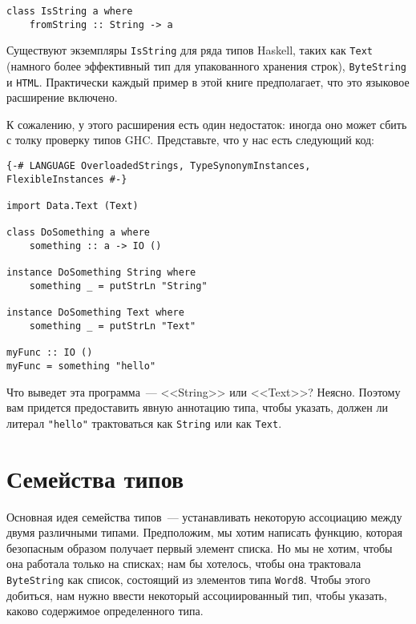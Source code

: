 \begin{lstlisting}
class IsString a where
    fromString :: String -> a
\end{lstlisting}

Существуют экземпляры \lstinline'IsString' для ряда типов Haskell, таких как \lstinline'Text' (намного более эффективный тип для упакованного хранения строк), \lstinline'ByteString' и \lstinline'HTML'. Практически каждый пример в этой книге предполагает, что это языковое расширение включено.

К сожалению, у этого расширения есть один недостаток: иногда оно может сбить с толку проверку типов GHC. Представьте, что у нас есть следующий код:

\begin{lstlisting}
{-# LANGUAGE OverloadedStrings, TypeSynonymInstances, FlexibleInstances #-}

import Data.Text (Text)

class DoSomething a where
    something :: a -> IO ()

instance DoSomething String where
    something _ = putStrLn "String"

instance DoSomething Text where
    something _ = putStrLn "Text"

myFunc :: IO ()
myFunc = something "hello"
\end{lstlisting}

Что выведет эта программа~--- <<String>> или <<Text>>? Неясно. Поэтому вам придется предоставить явную аннотацию типа, чтобы указать, должен ли литерал \lstinline'"hello"' трактоваться как \lstinline'String' или как \lstinline'Text'.

\section{Семейства типов}

Основная идея семейства типов~--- устанавливать некоторую ассоциацию между двумя различными типами. Предположим, мы хотим написать функцию, которая безопасным образом получает первый элемент списка. Но мы не хотим, чтобы она работала только на списках; нам бы хотелось, чтобы она трактовала \lstinline'ByteString' как список, состоящий из элементов типа \lstinline'Word8'. Чтобы этого добиться, нам нужно ввести некоторый ассоциированный тип, чтобы указать, каково содержимое определенного типа.

